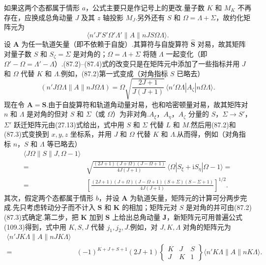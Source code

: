 如果这两个态都属于情形 $a$，公式主要只是作记号上的更改.量子数 $K$ 和 $M_K$ 不再存在，应换成总角动量 $J$ 及其 $z$ 轴投影 $M_J$.另外还有 $S$ 和 $\Omega=\Lambda+\Sigma$，故约化矩阵元为
\begin{equation*}
  \langle n'J'S'\Omega'\Lambda'\parallel A\parallel nJS\Omega\Lambda\rangle.
\end{equation*}
设 $\boldsymbol{A}$ 为任一轨道矢量（即不依赖于自旋）.其算符与自旋算符 $\hat{\boldsymbol{S}}$ 对易，故其矩阵对量子数 $S$ 和 $S_\zeta=\Sigma$ 是对角的；$\Omega=\Lambda+\Sigma$ 将随 $\Lambda$ 一起变化（即 $\Omega'-\Omega=\Lambda'-\Lambda$）.(87.2)–(87.4)式的改变只是在矩阵元中添加了一些指标并用 $J$ 和 $\Omega$ 代替 $K$ 和 $\Lambda$.例如，(87.2)第一式变成（对角指标 $S$ 已略去）
\begin{equation*}
  (n'J\Omega\Lambda\parallel A\parallel nJ\Omega\Lambda)
  =\Omega\sqrt{\frac{2J+1}{J(J+1)}}\,
  \langle n'\Omega\Lambda|A_\zeta|n\Omega\Lambda\rangle.
\end{equation*}
现在令 $\boldsymbol{A}=\boldsymbol{S}$.由于自旋算符和轨道角动量对易，也和哈密顿量对易，故其矩阵对 $n$ 和 $\Lambda$ 是对角的但对 $S$ 和 $\Sigma$（或 $\Omega$）为非对角.$A_\xi$，$A_\eta$，$A_\zeta$ 分量的 $S$，$\Sigma\to S'$，$\Sigma'$ 跃迁矩阵元由(27.13)式给出，式中用 $S$ 和 $\Sigma$ 代替 $L$ 和 $M$.然后用(87.2)和(87.3)式变换到 $x,y,z$ 坐标系，并用 $J$ 和 $\Omega$ 代替 $K$ 和 $\Lambda$.从而得，例如（对角指标 $n$，$S$ 和 $\Lambda$ 等已略去）
\begin{equation*}
\begin{aligned}
  \langle J\Omega\parallel S\parallel J,\Omega-1\rangle&\\
  ={}&\sqrt{\frac{(2J+1)(J+\Omega)(J-\Omega+1)}{4J(J+1)}}\,
  \langle\Omega|S_\xi+\mathrm{i}S_\eta|\Omega-1\rangle=\\
  ={}&\left[\frac{(2J+1)(J+\Omega)(J-\Omega+1)(S+\Sigma)(S-\Sigma+1)}{4J(J+1)}\right]^{1/2}.
\end{aligned}
\end{equation*}
其次，假定两个态都属于情形 $b$，并设 $\boldsymbol{A}$ 为轨道矢量，矩阵元的计算可分两步完成.先只考虑转动分子而不计入 $\boldsymbol{S}$ 和 $\boldsymbol{K}$ 的相加；矩阵元对 $S$ 是对角的并可由(87.2)(87.3)式确定.第二步，把 $\boldsymbol{K}$ 加到 $\boldsymbol{S}$ 上给出总角动量 $\boldsymbol{J}$，新矩阵元可用普遍公式(109.3)得到，式中用 $K,S,J$ 代替 $j_1,j_2,J$.例如，对 $J,K,\Lambda$ 对角的矩阵元为
\begin{equation*}
\begin{aligned}
  \langle n'JK\Lambda\parallel A\parallel nJK\Lambda\rangle&\\
  ={}&(-1)^{K+J+S+1}(2J+1)
  \left\{\begin{array}{ccc}K&J&S\\J&K&1\end{array}\right\}
  \langle n'K\Lambda\parallel A\parallel nK\Lambda\rangle.
\end{aligned}
\end{equation*}
